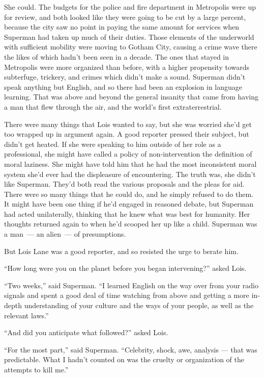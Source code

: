\documentclass[ebook,12pt]{memoir}
\begin{document}
She could. The budgets for the police and fire department in Metropolis
were up for review, and both looked like they were going to be cut by a
large percent, because the city saw no point in paying the same amount
for services when Superman had taken up much of their duties. Those
elements of the underworld with sufficient mobility were moving to
Gotham City, causing a crime wave there the likes of which hadn't been
seen in a decade. The ones that stayed in Metropolis were more organized
than before, with a higher propensity towards subterfuge, trickery, and
crimes which didn't make a sound. Superman didn't speak anything but
English, and so there had been an explosion in language learning. That
was above and beyond the general insanity that came from having a man
that flew through the air, and the world's first extraterrestrial.

There were many things that Lois wanted to say, but she was worried
she'd get too wrapped up in argument again. A good reporter pressed
their subject, but didn't get heated. If she were speaking to him
outside of her role as a professional, she might have called a policy of
non‐intervention the definition of moral laziness. She might have told
him that he had the most inconsistent moral system she'd ever had the
displeasure of encountering. The truth was, she didn't like Superman.
They'd both read the various proposals and the pleas for aid. There were
so many things that he could do, and he simply refused to do them. It
might have been one thing if he'd engaged in reasoned debate, but
Superman had acted unilaterally, thinking that he knew what was best for
humanity. Her thoughts returned again to when he'd scooped her up like a
child. Superman was a man~--- an alien~--- of presumptions.

But Lois Lane was a good reporter, and so resisted the urge to berate
him.

``How long were you on the planet before you began intervening?'' asked
Lois.

``Two weeks,'' said Superman. ``I learned English on the way over from
your radio signals and spent a good deal of time watching from above and
getting a more in‐depth understanding of your culture and the ways of
your people, as well as the relevant laws.''

``And did you anticipate what followed?'' asked Lois.

``For the most part,'' said Superman. ``Celebrity, shock, awe, analysis
--- that was predictable. What I hadn't counted on was the cruelty or
organization of the attempts to kill me.''
\end{document}
